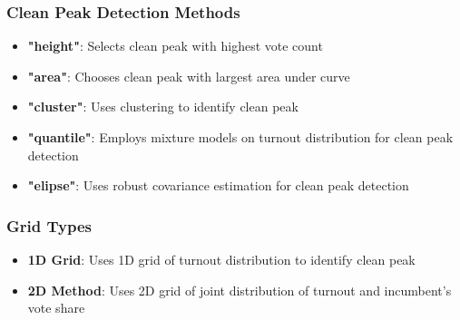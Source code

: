 \documentclass{article}
\begin{document}
\subsubsection{Clean Peak Detection Methods}
\begin{itemize}
    \item \textbf{"height"}: Selects clean peak with highest vote count
    \item \textbf{"area"}: Chooses clean peak with largest area under curve
    \item \textbf{"cluster"}: Uses clustering to identify clean peak
    \item \textbf{"quantile"}: Employs mixture models on turnout distribution for clean peak detection
    \item \textbf{"elipse"}: Uses robust covariance estimation for clean peak detection
\end{itemize}

\subsubsection{Grid Types}
\begin{itemize}
    \item \textbf{1D Grid}: Uses 1D grid of turnout distribution to identify clean peak
    \item \textbf{2D Method}: Uses 2D grid of joint distribution of turnout and incumbent's vote share
\end{itemize}
\end{document}
